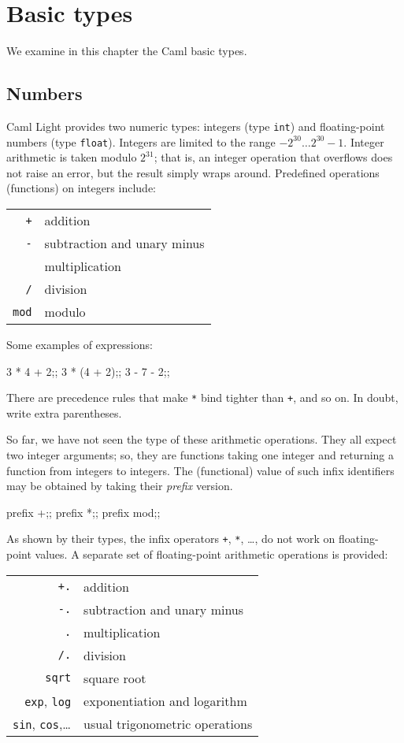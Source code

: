 \chapter{Basic types}
\label{c:basic}

We examine in this chapter the Caml basic types.

\section{Numbers}

Caml Light provides two numeric types: integers (type \verb"int") and
floating-point numbers (type \verb"float"). Integers are limited to
the range $-2^{30} \ldots 2^{30}-1$. Integer arithmetic is taken modulo
$2^{31}$; that is, an integer operation that overflows does not raise an
error, but the result simply wraps around. Predefined operations
(functions) on integers include:
\begin{center}
\begin{tabular}{rl}
{\tt +} &addition\\
{\tt -} &subtraction and unary minus\\
{\tt *} &multiplication\\
{\tt /} &division\\
{\tt mod} &modulo
\end{tabular}
\end{center}

Some examples of expressions:
\begin{caml_example}
3 * 4 + 2;;
3 * (4 + 2);;
3 - 7 - 2;;
\end{caml_example}
There are precedence rules that make \verb"*" bind tighter than \verb"+", and so on. In doubt, write extra parentheses.
\par
So far, we have not seen the type of these arithmetic operations.
They all expect  two integer arguments; so, they are functions taking
one integer and returning a function from integers to integers.
The (functional) value of such infix identifiers may be obtained by taking
their {\em prefix} version.
\begin{caml_example}
prefix +;;
prefix *;;
prefix mod;;
\end{caml_example}

As shown by their types, the infix operators \verb"+", \verb"*",
\ldots, do not work on floating-point values. A separate set of
floating-point arithmetic operations is provided:

\begin{center}
\begin{tabular}{rl}
{\tt +.} &addition\\
{\tt -.} &subtraction and unary minus\\
{\tt *.} &multiplication\\
{\tt /.} &division\\
\verb"sqrt" & square root \\
\verb"exp", \verb"log" & exponentiation and logarithm \\
\verb"sin", \verb"cos",\ldots & usual trigonometric operations
\end{tabular}
\end{center}

